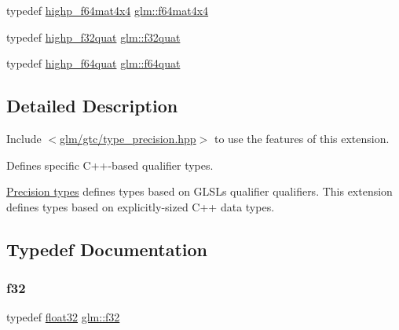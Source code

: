 \begin{DoxyCompactItemize}
\item 
typedef \hyperlink{namespaceglm_a62d8193501bb25dd5cfb8c271f52130a}{highp\+\_\+f64mat4x4} \hyperlink{group__gtc__type__precision_ga5fc21633b1546e4599609c47b4c8dac4}{glm\+::f64mat4x4}
\item 
typedef \hyperlink{namespaceglm_af8fed7ddfeb05fe07ba9d661644b8a47}{highp\+\_\+f32quat} \hyperlink{group__gtc__type__precision_gac59c4d798396552e4bbb866b3d8a2f18}{glm\+::f32quat}
\item 
typedef \hyperlink{namespaceglm_a50e023f42b7d0e2f40eff32ace71ae1a}{highp\+\_\+f64quat} \hyperlink{group__gtc__type__precision_ga5b54d7b36fbee5e271f73e6ed74e7172}{glm\+::f64quat}
\end{DoxyCompactItemize}


\subsection{Detailed Description}
Include $<$\hyperlink{type__precision_8hpp}{glm/gtc/type\+\_\+precision.\+hpp}$>$ to use the features of this extension.

Defines specific C++-\/based qualifier types.

\hyperlink{group__core__precision}{Precision types} defines types based on G\+L\+SL\textquotesingle{}s qualifier qualifiers. This extension defines types based on explicitly-\/sized C++ data types. 

\subsection{Typedef Documentation}
\mbox{\label{group__gtc__type__precision_ga0ec999b57f5330d9021256e96038df04}} 
\subsubsection{\texorpdfstring{f32}{f32}}
{\footnotesize\ttfamily typedef \hyperlink{group__gtc__type__precision_ga814f2f65354b6588b067cc5c67a6b340}{float32} \hyperlink{group__gtc__type__precision_ga0ec999b57f5330d9021256e96038df04}{glm\+::f32}}

